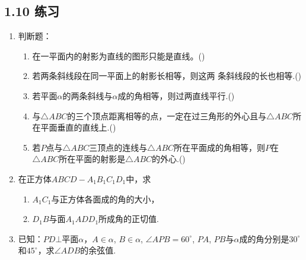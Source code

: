 \subsection*{1.10 练习}
\begin{enumerate}
    \item 判断题：
\begin{enumerate}[(1)]
\item 在一平面内的射影为直线的图形只能是直线。\hfill(\quad)
\item 若两条斜线段在同一平面上的射影长相等，则这两
条斜线段的长也相等.\hfill(\quad)
\item 若平面$\alpha$的两条斜线与$\alpha$成的角相等，则过两直线平行.\hfill(\quad)
\item 与$\triangle ABC$的三个顶点距离相等的点，一定在过三角形的外心且与$\triangle ABC$所在平面垂直的直线上.\hfill(\quad)
\item 若$P$点与$\triangle ABC$三顶点的连线与$\triangle ABC$所在平面成的角相等，则$P$在$\triangle ABC$所在平面的射影是$\triangle ABC$的外心.\hfill(\quad)
\end{enumerate}

\item 在正方体$ABCD-A_1B_1C_1D_1$中，求
\begin{enumerate}[(1)]
    \item $A_1C_1$与正方体各面成的角的大小，
    \item $D_1B$与面$A_1ADD_1$所成角的正切值.
\end{enumerate}

\begin{minipage}{.48\textwidth}
    \centering
\end{minipage}\hfill
\begin{minipage}{.48\textwidth}
    \centering
\end{minipage}


\item 已知：$PD\bot $平面$\alpha$，$A\in\alpha$, $B\in\alpha$, $\angle APB=60^{\circ}$, $PA$, $PB$与$\alpha$成的角分别是$30^{\circ}$和$45^{\circ}$，求$\angle ADB$的余弦值.
\end{enumerate}
